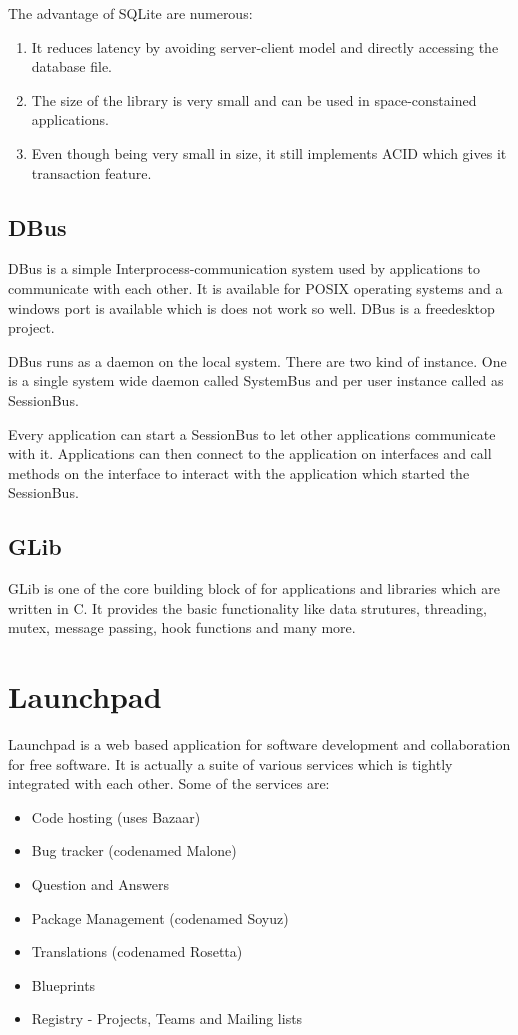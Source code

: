 The advantage of SQLite are numerous:
\begin{enumerate}
\item It reduces latency by avoiding server-client model and directly accessing 
the database file.
\item The size of the library is very small and can be used in space-constained 
applications. 
\item Even though being very small in size, it still implements ACID which 
gives it transaction feature.
\end{enumerate}

\subsection{DBus}
DBus is a simple Interprocess-communication system used by applications to communicate 
with each other. It is available for POSIX operating systems and a windows port is 
available which is does not work so well. DBus is a freedesktop project.

DBus runs as a daemon on the local system. There are two kind of instance. One is a 
single system wide daemon called SystemBus and per user instance called as SessionBus. 

Every application can start a SessionBus to let other applications communicate with it. 
Applications can then connect to the application on interfaces and call methods on the 
interface to interact with the application which started the SessionBus.
\subsection{GLib}
GLib is one of the core building block of for applications and libraries which are 
written in C. It provides the basic functionality like data strutures, threading, mutex, 
message passing, hook functions and many more.

\section{Launchpad}

Launchpad is a web based application for software development and collaboration for 
free software. It is actually a suite of various services which is tightly integrated 
with each other. Some of the services are:
\begin{itemize}
\item Code hosting (uses Bazaar)
\item Bug tracker (codenamed Malone)
\item Question and Answers
\item Package Management (codenamed Soyuz)
\item Translations (codenamed Rosetta)
\item Blueprints
\item Registry - Projects, Teams and Mailing lists
\end{itemize}

